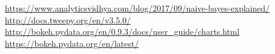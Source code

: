 \documentclass[journal, a4paper]{IEEEtran}
\begin{document}
\begin{thebibliography}{5}

		\url{https://www.analyticsvidhya.com/blog/2017/09/naive-bayes-explained/}
    	\url{http://docs.tweepy.org/en/v3.5.0/}
    	\url{http://bokeh.pydata.org/en/0.9.3/docs/user_guide/charts.html}        
    	\url{https://bokeh.pydata.org/en/latest/}
\end{thebibliography}

\end{document}
